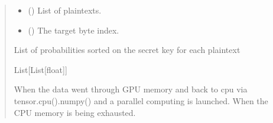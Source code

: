 \documentclass[letterpaper,10pt,english]{sphinxmanual}
\begin{document}
\begin{fulllineitems}
\begin{fulllineitems}
\begin{quote}
\begin{description}
\begin{itemize}
\item {} 
\sphinxAtStartPar
{} (\sphinxstyleliteralemphasis{\sphinxupquote{{[}}}\sphinxstyleliteralemphasis{\sphinxupquote{{[}}}\sphinxstyleliteralemphasis{\sphinxupquote{{]}}}\sphinxstyleliteralemphasis{\sphinxupquote{{]}}}) \textendash{} List of plaintexts.

\item {} 
\sphinxAtStartPar
{} () \textendash{} The target byte index.

\end{itemize}

\sphinxAtStartPar
List of probabilities sorted on the secret key for each plaintext

\sphinxAtStartPar
List{[}List{[}float{]}{]}

\sphinxAtStartPar
{} \textendash{} When the data went through GPU memory and back to cpu via tensor.cpu().numpy() and
    a parallel computing is launched.
    When the CPU memory is being exhausted.

\end{description}\end{quote}

\end{fulllineitems}


\end{fulllineitems}

\end{document}
